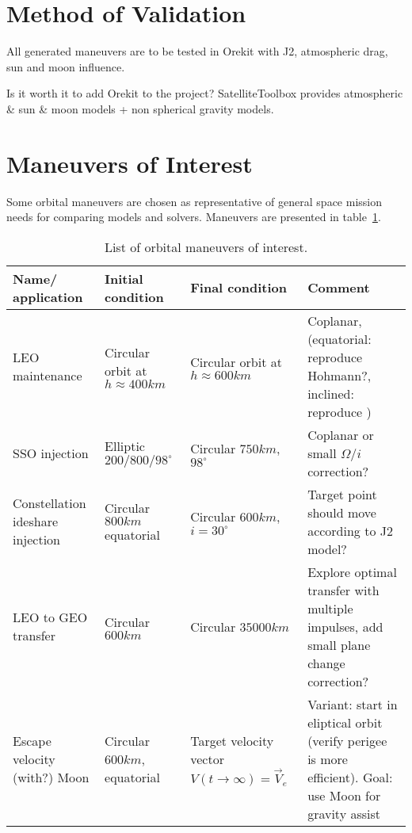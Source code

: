 \section{Method of Validation}

All generated maneuvers are to be tested in Orekit with J2, atmospheric drag, sun and moon influence.

Is it worth it to add Orekit to the project? SatelliteToolbox provides atmospheric \& sun \& moon models + non spherical gravity models.

\section{Maneuvers of Interest}

Some orbital maneuvers are chosen as representative of general space mission needs for comparing models and solvers. Maneuvers are presented in table~\ref{tab:man_interest}. 

\begin{table}[htpb]
    \centering
    \begin{tabular}{>{\centering\arraybackslash}m{3cm}>{\centering\arraybackslash}m{3cm}>{\centering\arraybackslash}m{3cm}>{\centering\arraybackslash}m{3cm}}\toprule
        \textbf{Name/ application} & \textbf{Initial condition} & \textbf{Final condition} & \textbf{Comment}\\ \midrule
        LEO maintenance & Circular orbit at \(h \approx 400km\) & Circular orbit at \(h \approx 600km\) & Coplanar, (equatorial: reproduce Hohmann?, inclined: reproduce \cite{sandro_quasi_circ}) \\ \midrule
        SSO injection & Elliptic \(200/800/98^\circ\) & Circular \(750km\), \(98^\circ \) & Coplanar or small \(\Omega\)/\(i\) correction? \\ \midrule
        Constellation ideshare injection & Circular \(800km\) equatorial & Circular \(600km\), \(i=30^\circ\) & Target point should move according to J2 model? \\ \midrule
        LEO to GEO transfer & Circular \(600km\) & Circular \(35000km\) & Explore optimal transfer with multiple impulses, add small plane change correction? \\ \midrule
        Escape velocity (with?) Moon & Circular \(600km\), equatorial & Target velocity vector \(V(t \rightarrow \infty) = \vec{V}_e\) & Variant: start in eliptical orbit (verify perigee is more efficient). Goal: use Moon for gravity assist \\ \bottomrule
    \end{tabular}
    \caption{List of orbital maneuvers of interest.}\label{tab:man_interest}
\end{table}

